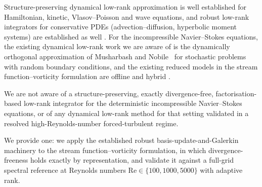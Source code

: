 Structure-preserving dynamical low-rank approximation is well established for
Hamiltonian, kinetic, Vlasov--Poisson and wave equations, and robust low-rank
integrators for conservative PDEs (advection--diffusion, hyperbolic moment
systems) are established as well
\cite{koch2007,lubich2014,kusch2023stability,einkemmer2023,ceruti2024,
rail2025,koellermeier2024,cui2026,goutaudier2026,einkemmer2024review}. For the incompressible Navier--Stokes equations, the
existing dynamical low-rank work we are aware of is the dynamically
orthogonal approximation of Musharbash and Nobile~\cite{musharbash2018} for
stochastic problems with random boundary conditions, and the existing
reduced models in the stream function--vorticity formulation are offline and
hybrid \cite{girfoglio2022pod,zhang2024}.

We are not aware of a structure-preserving, exactly divergence-free,
factorisation-based low-rank integrator for the deterministic incompressible
Navier--Stokes equations, or of any dynamical low-rank method for that
setting validated in a resolved high-Reynolds-number forced-turbulent regime.

We provide one: we apply the established robust basis-update-and-Galerkin
machinery to the stream function--vorticity formulation, in which
divergence-freeness holds exactly by representation, and validate it against
a full-grid spectral reference at Reynolds numbers $\mathrm{Re} \in \{100,
1000, 5000\}$ with adaptive rank.
